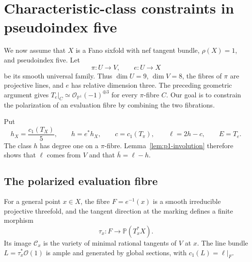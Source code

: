 \section{Characteristic-class constraints in pseudoindex five}
\label{sec:characteristic-classes}

We now assume that $X$ is a Fano sixfold with nef tangent bundle,
$\rho(X)=1$, and pseudoindex five. Let
\[
 \pi:U\longrightarrow V,\qquad e:U\longrightarrow X
\]
be its smooth universal family. Thus $\dim U=9$, $\dim V=8$,
the fibres of $\pi$ are projective lines, and $e$ has relative dimension
three. The preceding geometric argument gives
$T_e|_C\simeq\mathcal O_{\mathbb P^1}(-1)^{\oplus3}$ for every
$\pi$-fibre $C$. Our goal is to constrain the polarization of an
evaluation fibre by combining the two fibrations.

Put
\begin{equation}\label{eq:d5-generators}
 h_X=\frac{c_1(T_X)}5,\qquad h=e^*h_X,\qquad
 c=c_1(T_\pi),\qquad \ell=2h-c,\qquad E=T_e.
\end{equation}
The class $h$ has degree one on a $\pi$-fibre. Lemma~\ref{lem:p1-involution}
therefore shows that $\ell$ comes from $V$ and that $\bar h=\ell-h$.

\subsection{The polarized evaluation fibre}

\begin{lemma}\label{lem:marked-tangent}
For a general point $x\in X$, the fibre $F=e^{-1}(x)$ is a smooth
irreducible projective threefold, and the tangent direction at the marking
defines a finite morphism
\[
 \tau_x\colon F\longrightarrow\mathbb P(T_x^*X).
\]
Its image $\mathcal C_x$ is the variety of minimal rational tangents of
$V$ at $x$.  The line bundle $L=\tau_x^*\mathcal O(1)$ is ample and
generated by global sections, with $c_1(L)=\ell|_F$.
\end{lemma}

